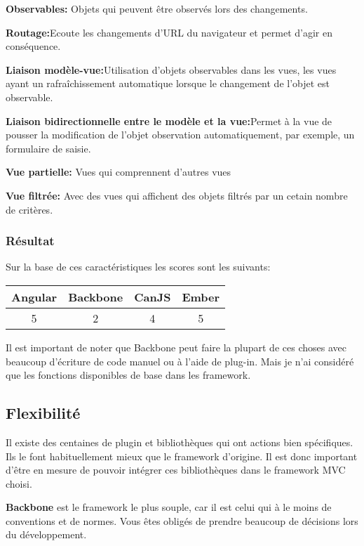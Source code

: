 \textbf{Observables:} Objets qui peuvent être observés lors des changements.

\textbf{Routage:}Ecoute les changements d’URL du navigateur et permet d’agir en conséquence.

\textbf{Liaison modèle-vue:}Utilisation d’objets observables dans les vues, les vues ayant un rafraîchissement automatique lorsque le changement de l’objet est observable.

\textbf{Liaison bidirectionnelle entre le modèle et la vue:}Permet à la vue de pousser la modification de l’objet observation automatiquement, par exemple, un formulaire de saisie.

\textbf{Vue partielle:} Vues qui comprennent d’autres vues

\textbf{Vue filtrée:} Avec des vues qui affichent des objets filtrés par un cetain nombre de critères.

\subsubsection{Résultat}

Sur la base de ces caractéristiques les scores sont les suivants:

\begin{tabular}{|c|c|c|c|}
  \hline 
  Angular & Backbone & CanJS & Ember \\
  \hline 
  5 & 2 & 4 & 5 \\
  \hline
\end{tabular}

Il est important de noter que Backbone peut faire la plupart de ces choses avec beaucoup d’écriture de code manuel ou à l’aide de plug-in. Mais je n’ai considéré que les fonctions disponibles de base dans les framework.

\subsection{Flexibilité}

Il existe des centaines de plugin et bibliothèques qui ont actions bien spécifiques. Ils le font habituellement mieux que le framework d'origine. Il est donc important d’être en mesure de pouvoir intégrer ces bibliothèques dans le framework MVC choisi.

\textbf{Backbone} est le framework le plus souple, car il est celui qui à le moins de conventions et de normes. Vous êtes obligés de prendre beaucoup de décisions lors du développement.

